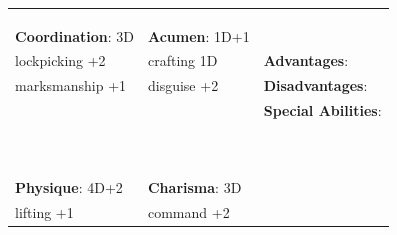 \documentclass[10pt]{article}
\begin{document}
\begin{table}
\begin{tabular}{m{156pt} m{156pt} m{156pt}}
 \hrulefill &  \hrulefill & \\

 \hrulefill &  \hrulefill & \\

 \hrulefill &  \hrulefill & \\


\textbf{Coordination}: 3D \hrulefill & \textbf{Acumen}: 1D+1 \hrulefill     & \hrulefill \\

lockpicking       +2 \hrulefill & crafting          1D \hrulefill & \textbf{Advantages}: \hrulefill \\

marksmanship      +1 \hrulefill & disguise          +2 \hrulefill & \textbf{Disadvantages}: \hrulefill \\

 \hrulefill &  \hrulefill & \textbf{Special Abilities}: \hrulefill \\

 \hrulefill &  \hrulefill &  \hrulefill \\

 \hrulefill &  \hrulefill &  \hrulefill \\

 \hrulefill &  \hrulefill &  \hrulefill \\

 \hrulefill &  \hrulefill &  \hrulefill \\

 \hrulefill &  \hrulefill &  \hrulefill \\

 \hrulefill &  \hrulefill &  \hrulefill \\

 \hrulefill &  \hrulefill &  \hrulefill \\

 \hrulefill &  \hrulefill &  \hrulefill \\

 \hrulefill &  \hrulefill &  \hrulefill \\

 \hrulefill &  \hrulefill &  \hrulefill \\


\textbf{Physique}: 4D+2 \hrulefill & \textbf{Charisma}: 3D \hrulefill     &  \hrulefill \\

lifting           +1 \hrulefill & command           +2 \hrulefill &  \hrulefill \\


\end{tabular}
\end{table}
\end{document}
